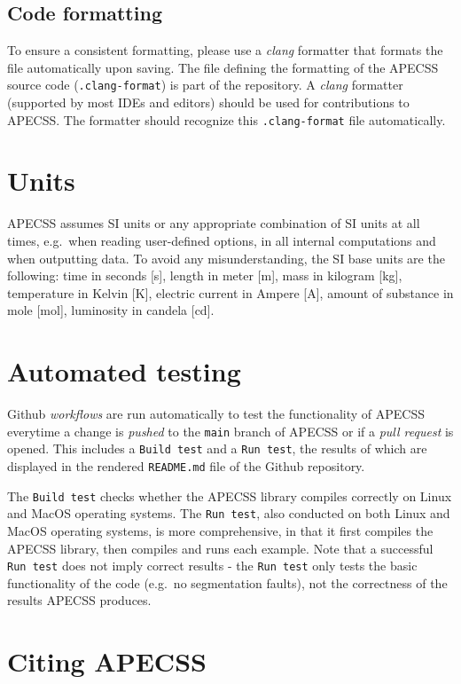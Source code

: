 \subsection{Code formatting}
\label{sec:clang}

To ensure a consistent formatting, please use a \textit{clang} formatter that formats the file automatically upon saving. The file defining the formatting of the APECSS source code ({\tt .clang-format}) is part of the repository. A \textit{clang} formatter (supported by most IDEs and editors) should be used for contributions to APECSS. The formatter should recognize this {\tt .clang-format} file automatically.

\section{Units}

APECSS assumes SI units or any appropriate combination of SI units at all times, e.g.~when reading user-defined options, in all internal computations and when outputting data. To avoid any misunderstanding, the SI base units are the following:  time in seconds [s], length in meter [m], mass in kilogram [kg], temperature in Kelvin [K], electric current in Ampere [A], amount of substance in mole [mol], luminosity in candela [cd].

\section{Automated testing}

Github {\it workflows} are run automatically to test the functionality of APECSS everytime a change is {\it pushed} to the {\tt main} branch of APECSS or if a {\it pull request} is opened.
This includes a {\tt Build test} and a {\tt Run test}, the results of which are displayed in the rendered {\tt README.md} file of the Github repository.

The {\tt Build test} checks whether the APECSS library compiles correctly on Linux and MacOS operating systems. The {\tt Run test}, also conducted on both Linux and MacOS operating systems, is more comprehensive, in that it first compiles the APECSS library, then compiles and runs each example. Note that a successful {\tt Run test} does not imply correct results - the {\tt Run test} only tests the basic functionality of the code (e.g.~no segmentation faults), not the correctness of the results APECSS produces. 

\section{Citing APECSS}

